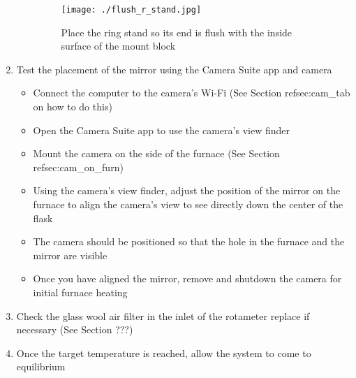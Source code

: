 \begin{enumerate}
\begin{itemize}
    \begin{figure}
    \hypertarget{fig:flush_r_stand}{%
    \centering
    \texttt{[image: ./flush\_r\_stand.jpg]}
    \caption{Place the ring stand so its end is flush with the inside
    surface of the mount block}\label{fig:flush_r_stand}
    }
    \end{figure}
  \end{itemize}
\item
  Test the placement of the mirror using the Camera Suite app and camera

  \begin{itemize}
  \tightlist
  \item
    Connect the computer to the camera's Wi-Fi (See Section
    refsec:cam\_tab on how to do this)
  \item
    Open the Camera Suite app to use the camera's view finder
  \item
    Mount the camera on the side of the furnace (See Section
    refsec:cam\_on\_furn)
  \item
    Using the camera's view finder, adjust the position of the mirror on
    the furnace to align the camera's view to see directly down the
    center of the flask
  \item
    The camera should be positioned so that the hole in the furnace and
    the mirror are visible
  \item
    Once you have aligned the mirror, remove and shutdown the camera for
    initial furnace heating
  \end{itemize}
\item
  Check the glass wool air filter in the inlet of the rotameter replace
  if necessary (See Section ???)
\item
  Once the target temperature is reached, allow the system to come to
  equilibrium


\end{enumerate}
